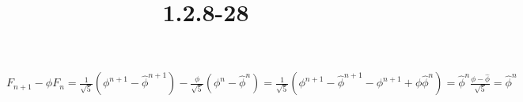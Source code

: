 \documentclass{article}
\title{1.2.8-28}
\begin{document}
\maketitle

$F_{n+1} - \phi F_n = \frac{1}{\sqrt{5}}(\phi^{n+1} - \hat{\phi}^{n+1}) - \frac{\phi}{\sqrt{5}}(\phi^{n} - \hat{\phi}^{n}) = \frac{1}{\sqrt{5}}(\phi^{n+1} - \hat{\phi}^{n+1} - \phi^{n+1} + \phi \hat{\phi}^n) = \hat{\phi}^n \frac{\phi-\hat{\phi}}{\sqrt{5}} = \hat{\phi}^n$
\end{document}
